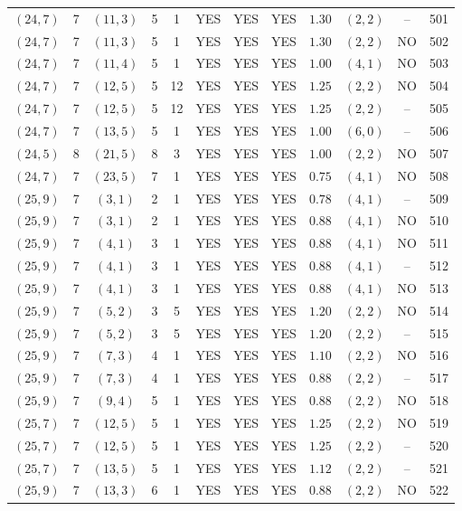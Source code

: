 \begin{longtable}{|c|c|c|c|c|c|c|c|c|c|c|c|}
$(24,7)$ & 7 & $(11,3)$ & 5 & 1 & YES & YES & YES & $1.30$ & $(2,2)$ & -- & 501\\
$(24,7)$ & 7 & $(11,3)$ & 5 & 1 & YES & YES & YES & $1.30$ & $(2,2)$ & NO & 502\\
$(24,7)$ & 7 & $(11,4)$ & 5 & 1 & YES & YES & YES & $1.00$ & $(4,1)$ & NO & 503\\
$(24,7)$ & 7 & $(12,5)$ & 5 & 12 & YES & YES & YES & $1.25$ & $(2,2)$ & NO & 504\\
$(24,7)$ & 7 & $(12,5)$ & 5 & 12 & YES & YES & YES & $1.25$ & $(2,2)$ & -- & 505\\
$(24,7)$ & 7 & $(13,5)$ & 5 & 1 & YES & YES & YES & $1.00$ & $(6,0)$ & -- & 506\\
$(24,5)$ & 8 & $(21,5)$ & 8 & 3 & YES & YES & YES & $1.00$ & $(2,2)$ & NO & 507\\
$(24,7)$ & 7 & $(23,5)$ & 7 & 1 & YES & YES & YES & $0.75$ & $(4,1)$ & NO & 508\\
$(25,9)$ & 7 & $(3,1)$ & 2 & 1 & YES & YES & YES & $0.78$ & $(4,1)$ & -- & 509\\
$(25,9)$ & 7 & $(3,1)$ & 2 & 1 & YES & YES & YES & $0.88$ & $(4,1)$ & NO & 510\\
$(25,9)$ & 7 & $(4,1)$ & 3 & 1 & YES & YES & YES & $0.88$ & $(4,1)$ & NO & 511\\
$(25,9)$ & 7 & $(4,1)$ & 3 & 1 & YES & YES & YES & $0.88$ & $(4,1)$ & -- & 512\\
$(25,9)$ & 7 & $(4,1)$ & 3 & 1 & YES & YES & YES & $0.88$ & $(4,1)$ & NO & 513\\
$(25,9)$ & 7 & $(5,2)$ & 3 & 5 & YES & YES & YES & $1.20$ & $(2,2)$ & NO & 514\\
$(25,9)$ & 7 & $(5,2)$ & 3 & 5 & YES & YES & YES & $1.20$ & $(2,2)$ & -- & 515\\
$(25,9)$ & 7 & $(7,3)$ & 4 & 1 & YES & YES & YES & $1.10$ & $(2,2)$ & NO & 516\\
$(25,9)$ & 7 & $(7,3)$ & 4 & 1 & YES & YES & YES & $0.88$ & $(2,2)$ & -- & 517\\
$(25,9)$ & 7 & $(9,4)$ & 5 & 1 & YES & YES & YES & $0.88$ & $(2,2)$ & NO & 518\\
$(25,7)$ & 7 & $(12,5)$ & 5 & 1 & YES & YES & YES & $1.25$ & $(2,2)$ & NO & 519\\
$(25,7)$ & 7 & $(12,5)$ & 5 & 1 & YES & YES & YES & $1.25$ & $(2,2)$ & -- & 520\\
$(25,7)$ & 7 & $(13,5)$ & 5 & 1 & YES & YES & YES & $1.12$ & $(2,2)$ & -- & 521\\
$(25,9)$ & 7 & $(13,3)$ & 6 & 1 & YES & YES & YES & $0.88$ & $(2,2)$ & NO & 522\\

\end{longtable}
